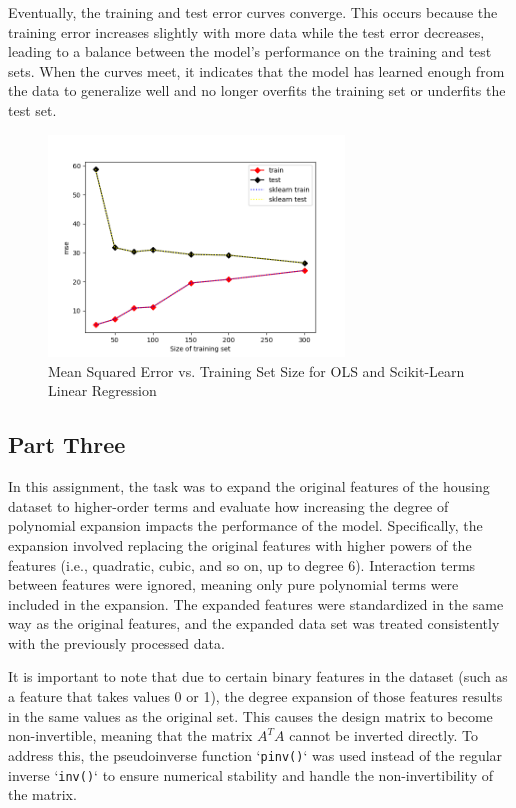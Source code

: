 \documentclass{article}
\begin{document}
Eventually, the training and test error curves converge. This occurs because the training error increases slightly with more data while the test error decreases, leading to a balance between the model's performance on the training and test sets. When the curves meet, it indicates that the model has learned enough from the data to generalize well and no longer overfits the training set or underfits the test set.

\begin{figure}[h!]
    \centering
    \includegraphics[width=0.7\textwidth]{sln_figures/fig4_2.png}
    \caption{Mean Squared Error vs. Training Set Size for OLS and Scikit-Learn Linear Regression}
    \label{fig:mse_vs_tn}
\end{figure}
\FloatBarrier


\subsection{Part Three}
In this assignment, the task was to expand the original features of the housing dataset to higher-order terms and evaluate how increasing the degree of polynomial expansion impacts the performance of the model. Specifically, the expansion involved replacing the original features with higher powers of the features (i.e., quadratic, cubic, and so on, up to degree 6). Interaction terms between features were ignored, meaning only pure polynomial terms were included in the expansion. The expanded features were standardized in the same way as the original features, and the expanded data set was treated consistently with the previously processed data.

It is important to note that due to certain binary features in the dataset (such as a feature that takes values 0 or 1), the degree expansion of those features results in the same values as the original set. This causes the design matrix to become non-invertible, meaning that the matrix \( A^T A \) cannot be inverted directly. To address this, the pseudoinverse function `\texttt{pinv()}` was used instead of the regular inverse `\texttt{inv()}` to ensure numerical stability and handle the non-invertibility of the matrix.
\end{document}
